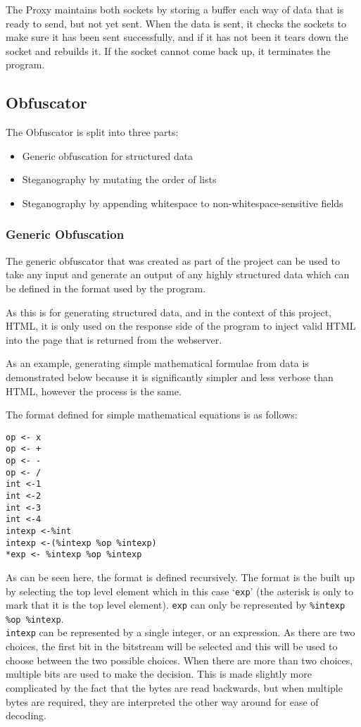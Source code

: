 The Proxy maintains both sockets by storing a buffer each way of data that is ready to send, but not yet sent. When the data is sent, it checks the sockets to make sure it has been sent successfully, and if it has not been it tears down the socket and rebuilds it. If the socket cannot come back up, it terminates the program.
\subsection{Obfuscator}
The Obfuscator is split into three parts:
\begin{itemize}
    \item Generic obfuscation for structured data
    \item Steganography by mutating the order of lists
    \item Steganography by appending whitespace to non-whitespace-sensitive fields
\end{itemize}

\subsubsection{Generic Obfuscation}
The generic obfuscator that was created as part of the project can be used to take any input and generate an output of any highly structured data which can be defined in the format used by the program.\par
As this is for generating structured data, and in the context of this project, HTML, it is only used on the response side of the program to inject valid HTML into the page that is returned from the webserver.\par
As an example, generating simple mathematical formulae from data is demonstrated below because it is significantly simpler and less verbose than HTML, however the process is the same.\par
The format defined for simple mathematical equations is as follows:
\begin{lstlisting}[language=pagefile]
op <- x
op <- +
op <- -
op <- /
int <-1
int <-2
int <-3
int <-4
intexp <-%int
intexp <-(%intexp %op %intexp)
*exp <- %intexp %op %intexp
\end{lstlisting}

As can be seen here, the format is defined recursively.
The format is the built up by selecting the top level element which in this case `\texttt{exp}' (the asterisk is only to mark that it is the top level element).
\texttt{exp} can only be represented by \texttt{\%intexp \%op \%intexp}. \\
\texttt{intexp} can be represented by a single integer, or an expression.
As there are two choices, the first bit in the bitstream will be selected and this will be used to choose between the two possible choices.
When there are more than two choices, multiple bits are used to make the decision.
This is made slightly more complicated by the fact that the bytes are read backwards, but when multiple bytes are required, they are interpreted the other way around for ease of decoding.


